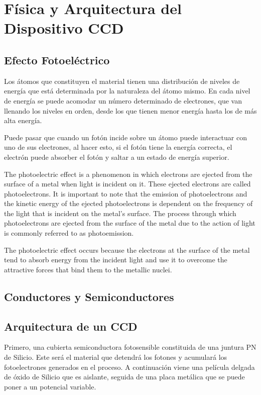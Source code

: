 \documentclass{article}
\begin{document}
\section{Física y Arquitectura del Dispositivo CCD}



\subsection{Efecto Fotoeléctrico}

Los átomos que constituyen el material tienen una distribución de niveles de energía que está determinada por la naturaleza del átomo mismo. En cada nivel de energía se puede acomodar un número determinado de electrones, que van llenando los niveles en orden, desde los que tienen menor energía hasta los de más alta energía.


Puede pasar que cuando un fotón incide sobre un átomo puede interactuar con uno de sus electrones, al hacer esto, si el fotón tiene la energía correcta, el electrón puede absorber el fotón y saltar a un estado de energía superior.

The photoelectric effect is a phenomenon in which electrons are ejected from the surface of a metal when light is incident on it. These ejected electrons are called photoelectrons. It is important to note that the emission of photoelectrons and the kinetic energy of the ejected photoelectrons is dependent on the frequency of the light that is incident on the metal's surface. The process through which photoelectrons are ejected from the surface of the metal due to the action of light is commonly referred to as photoemission.

The photoelectric effect occurs because the electrons at the surface of the metal tend to absorb energy from the incident light and use it to overcome the attractive forces that bind them to the metallic nuclei. 



\subsection{Conductores y Semiconductores}


\subsection{Arquitectura de un CCD}
Primero, una cubierta semiconductora fotosensible constituida de una juntura PN de Silicio. Este será el material que detendrá los fotones y acumulará los fotoelectrones generados en el proceso. A continuación viene una película delgada de óxido de Silicio que es aislante, seguida de una placa metálica que se puede poner a un potencial variable.
\end{document}
